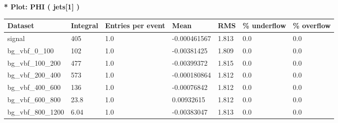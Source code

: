 \documentclass[a4paper, 10pt]{article}
\begin{document}
\textbf{* Plot: PHI ( jets[1] ) }\\
   \begin{table}[H]
  \begin{center}
    \begin{tabular}{|m{23.0mm}|m{23.0mm}|m{18.0mm}|m{19.0mm}|m{19.0mm}|m{19.0mm}|m{19.0mm}|}
      \hline
      {\cellcolor{yellow}         Dataset}& {\cellcolor{yellow}         Integral}& {\cellcolor{yellow}         Entries per event}& {\cellcolor{yellow}         Mean}& {\cellcolor{yellow}         RMS}& {\cellcolor{yellow}         \% underflow}& {\cellcolor{yellow}         \% overflow}\\
      \hline
      {\cellcolor{white}         signal}& {\cellcolor{white}         405}& {\cellcolor{white}         1.0}& {\cellcolor{white}         -0.000461567}& {\cellcolor{white}         1.813}& {\cellcolor{green}         0.0}& {\cellcolor{green}         0.0}\\
      \hline
      {\cellcolor{white}         bg\_vbf\_0\_100}& {\cellcolor{white}         102}& {\cellcolor{white}         1.0}& {\cellcolor{white}         -0.00381425}& {\cellcolor{white}         1.809}& {\cellcolor{green}         0.0}& {\cellcolor{green}         0.0}\\
      \hline
      {\cellcolor{white}         bg\_vbf\_100\_200}& {\cellcolor{white}         477}& {\cellcolor{white}         1.0}& {\cellcolor{white}         -0.00399372}& {\cellcolor{white}         1.815}& {\cellcolor{green}         0.0}& {\cellcolor{green}         0.0}\\
      \hline
      {\cellcolor{white}         bg\_vbf\_200\_400}& {\cellcolor{white}         573}& {\cellcolor{white}         1.0}& {\cellcolor{white}         -0.000180864}& {\cellcolor{white}         1.812}& {\cellcolor{green}         0.0}& {\cellcolor{green}         0.0}\\
      \hline
      {\cellcolor{white}         bg\_vbf\_400\_600}& {\cellcolor{white}         136}& {\cellcolor{white}         1.0}& {\cellcolor{white}         -0.00076842}& {\cellcolor{white}         1.812}& {\cellcolor{green}         0.0}& {\cellcolor{green}         0.0}\\
      \hline
      {\cellcolor{white}         bg\_vbf\_600\_800}& {\cellcolor{white}         23.8}& {\cellcolor{white}         1.0}& {\cellcolor{white}         0.00932615}& {\cellcolor{white}         1.812}& {\cellcolor{green}         0.0}& {\cellcolor{green}         0.0}\\
      \hline
      {\cellcolor{white}         bg\_vbf\_800\_1200}& {\cellcolor{white}         6.04}& {\cellcolor{white}         1.0}& {\cellcolor{white}         -0.00383047}& {\cellcolor{white}         1.813}& {\cellcolor{green}         0.0}& {\cellcolor{green}         0.0}\\

\end{tabular}
\end{center}
\end{table}
\end{document}
